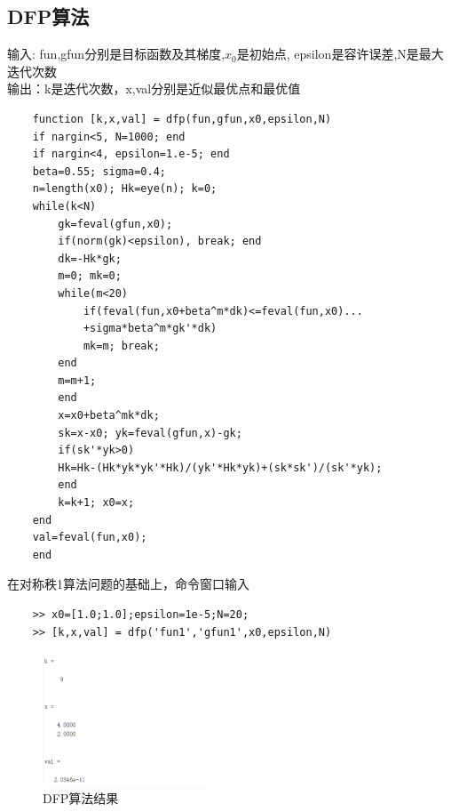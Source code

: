\documentclass[12pt]{article} %
\begin{document}
	\subsection{DFP算法}
	\indent 输入: fun,gfun分别是目标函数及其梯度,$x_0$是初始点,
	epsilon是容许误差,N是最大迭代次数\\
	\indent 输出：k是迭代次数，x,val分别是近似最优点和最优值
	\begin{lstlisting}
	function [k,x,val] = dfp(fun,gfun,x0,epsilon,N)
	if nargin<5, N=1000; end
	if nargin<4, epsilon=1.e-5; end
	beta=0.55; sigma=0.4;
	n=length(x0); Hk=eye(n); k=0;
	while(k<N)
		gk=feval(gfun,x0);
		if(norm(gk)<epsilon), break; end
		dk=-Hk*gk;
		m=0; mk=0;
		while(m<20)
			if(feval(fun,x0+beta^m*dk)<=feval(fun,x0)...
			+sigma*beta^m*gk'*dk)
			mk=m; break;
		end
		m=m+1;
		end
		x=x0+beta^mk*dk;
		sk=x-x0; yk=feval(gfun,x)-gk;
		if(sk'*yk>0)
		Hk=Hk-(Hk*yk*yk'*Hk)/(yk'*Hk*yk)+(sk*sk')/(sk'*yk);
		end
		k=k+1; x0=x;
	end
	val=feval(fun,x0);
	end
	\end{lstlisting}
	\indent 在对称秩1算法问题的基础上，命令窗口输入
	\begin{lstlisting}
	>> x0=[1.0;1.0];epsilon=1e-5;N=20;
	>> [k,x,val] = dfp('fun1','gfun1',x0,epsilon,N)
	\end{lstlisting}
	\begin{figure}[ht]
	\centering
	\includegraphics[width=0.45\textwidth]{dfp.png}
	\caption{DFP算法结果}
	\label{fig:fig1}
	\end{figure}
\end{document}
